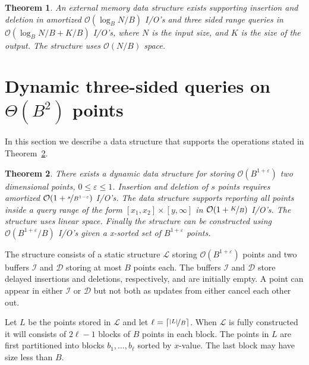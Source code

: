 \documentclass[twoside,11pt,openright]{report}
\def \epsilon {\varepsilon}
\newtheorem{theorem}{Theorem}
\begin{document}
\begin{theorem}
\label{thm:arge_structure}
An external memory data structure exists supporting insertion and deletion in amortized $\mathcal{O}(\log_B N/B)$ I/O's and three sided range queries in $\mathcal{O}(\log_B N/B + K/B)$ I/O's, where $N$ is the input size, and $K$ is the size of the output. The structure uses $\mathcal{O}(N/B)$ space.
\end{theorem}

\section{Dynamic three-sided queries on $\Theta(B^2)$ points}
\label{sec:child_structure}
In this section we describe a data structure that supports the operations stated in Theorem~\ref{thm:child_structure}.
\begin{theorem}
\label{thm:child_structure}
There exists a dynamic data structure for storing $\mathcal{O}(B^{1+\epsilon})$ two dimensional points, $0 \leq \epsilon \leq 1$.
Insertion and deletion of $s$ points requires amortized $\mathcal{O}(1+\nicefrac{s}{B^{1-\epsilon}})$ I/O's.
The data structure supports reporting all points inside a query range of the form $[x_1,x_2] \times [y,\infty]$ in $\mathcal{O}(1+\nicefrac{K}{B})$ I/O's.
The structure uses linear space.
Finally the structure can be constructed using $\mathcal{O}(B^{1+\epsilon} / B)$ I/O's given a x-sorted set of $B^{1+\epsilon}$ points.
\end{theorem}

The structure consists of a static structure $\mathcal{L}$ storing $\mathcal{O}(B^{1+\epsilon})$ points and two buffers $\mathcal{I}$ and $\mathcal{D}$ storing at most $B$ points each. The buffers $\mathcal{I}$ and $\mathcal{D}$ store delayed insertions and deletions, respectively, and are initially empty. A point can appear in either $\mathcal{I}$ or $\mathcal{D}$ but not both as updates from either cancel each other out.

Let $L$ be the points stored in $\mathcal{L}$ and let $\ell = \lceil \nicefrac{\vert L \vert}{B}\rceil$. When $\mathcal{L}$ is fully constructed it will consists of $2\ell-1$ blocks of $B$ points in each block. The points in $L$ are first partitioned into blocks $b_1,\dots,b_\ell$ sorted by $x$-value. The last block may have size less than $B$.
\end{document}
